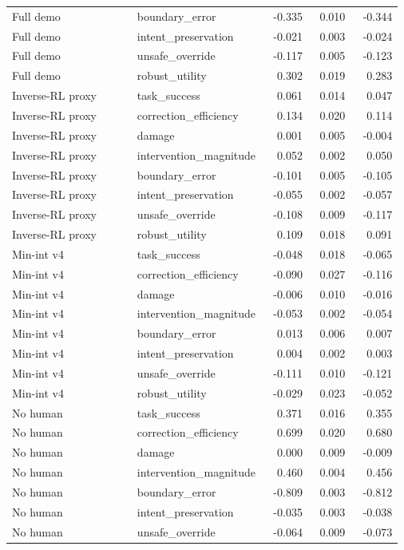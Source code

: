 \documentclass{article}
\begin{document}
\begin{center}
\begin{longtable}{p{0.32\linewidth}p{0.25\linewidth}rrr}
Full demo & boundary\_error & -0.335 & 0.010 & -0.344\\
Full demo & intent\_preservation & -0.021 & 0.003 & -0.024\\
Full demo & unsafe\_override & -0.117 & 0.005 & -0.123\\
Full demo & robust\_utility & 0.302 & 0.019 & 0.283\\
Inverse-RL proxy & task\_success & 0.061 & 0.014 & 0.047\\
Inverse-RL proxy & correction\_efficiency & 0.134 & 0.020 & 0.114\\
Inverse-RL proxy & damage & 0.001 & 0.005 & -0.004\\
Inverse-RL proxy & intervention\_magnitude & 0.052 & 0.002 & 0.050\\
Inverse-RL proxy & boundary\_error & -0.101 & 0.005 & -0.105\\
Inverse-RL proxy & intent\_preservation & -0.055 & 0.002 & -0.057\\
Inverse-RL proxy & unsafe\_override & -0.108 & 0.009 & -0.117\\
Inverse-RL proxy & robust\_utility & 0.109 & 0.018 & 0.091\\
Min-int v4 & task\_success & -0.048 & 0.018 & -0.065\\
Min-int v4 & correction\_efficiency & -0.090 & 0.027 & -0.116\\
Min-int v4 & damage & -0.006 & 0.010 & -0.016\\
Min-int v4 & intervention\_magnitude & -0.053 & 0.002 & -0.054\\
Min-int v4 & boundary\_error & 0.013 & 0.006 & 0.007\\
Min-int v4 & intent\_preservation & 0.004 & 0.002 & 0.003\\
Min-int v4 & unsafe\_override & -0.111 & 0.010 & -0.121\\
Min-int v4 & robust\_utility & -0.029 & 0.023 & -0.052\\
No human & task\_success & 0.371 & 0.016 & 0.355\\
No human & correction\_efficiency & 0.699 & 0.020 & 0.680\\
No human & damage & 0.000 & 0.009 & -0.009\\
No human & intervention\_magnitude & 0.460 & 0.004 & 0.456\\
No human & boundary\_error & -0.809 & 0.003 & -0.812\\
No human & intent\_preservation & -0.035 & 0.003 & -0.038\\
No human & unsafe\_override & -0.064 & 0.009 & -0.073\\

\end{longtable}
\end{center}
\end{document}
